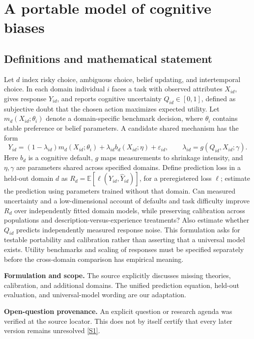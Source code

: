 \documentclass[11pt]{article}
\newcommand{\sref}[2]{\hyperlink{source:#1:#2}{[S#2]}}
\begin{document}
\section*{A portable model of cognitive biases}\label{30007583}
\subsection{Definitions and mathematical statement}
Let \(d\) index risky choice, ambiguous choice, belief updating, and intertemporal choice. In each domain individual \(i\) faces a task with observed attributes \(X_{id}\), gives response \(Y_{id}\), and reports cognitive uncertainty \(Q_{id}\in[0,1]\), defined as subjective doubt that the chosen action maximizes expected utility. Let \(m_d(X_{id};\theta_i)\) denote a domain-specific benchmark decision, where \(\theta_i\) contains stable preference or belief parameters. A candidate shared mechanism has the form
\[Y_{id}=(1-\lambda_{id})m_d(X_{id};\theta_i)+\lambda_{id}b_d(X_{id};\eta)+\varepsilon_{id},\qquad \lambda_{id}=g(Q_{id},X_{id};\gamma).\]
Here \(b_d\) is a cognitive default, \(g\) maps measurements to shrinkage intensity, and \(\eta,\gamma\) are parameters shared across specified domains. Define prediction loss in a held-out domain \(d\) as \(R_d=\mathbb E[\ell(Y_{id},\widehat Y_{id})]\), for a preregistered loss \(\ell\); estimate the prediction using parameters trained without that domain. Can measured uncertainty and a low-dimensional account of defaults and task difficulty improve \(R_d\) over independently fitted domain models, while preserving calibration across populations and description-versus-experience treatments? Also estimate whether \(Q_{id}\) predicts independently measured response noise. This formulation asks for testable portability and calibration rather than asserting that a universal model exists. Utility benchmarks and scaling of responses must be specified separately before the cross-domain comparison has empirical meaning.

\par\textbf{Formulation and scope.} The source explicitly discusses missing theories, calibration, and additional domains. The unified prediction equation, held-out evaluation, and universal-model wording are our adaptation.

\par\textbf{Open-question provenance.} An explicit question or research agenda was verified at the source locator. This does not by itself certify that every later version remains unresolved \sref{30007583}{1}.
\end{document}

